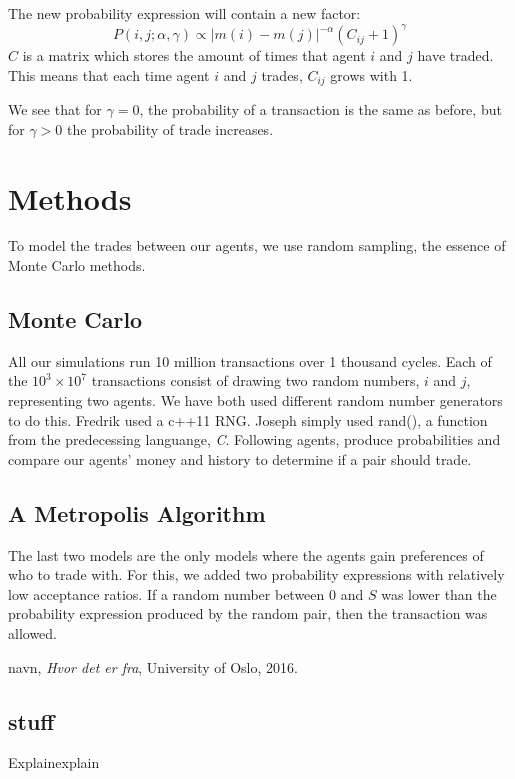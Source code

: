 \documentclass[10pt, a4paper]{article}
\begin{document}
The new probability expression will contain a new factor:
\begin{equation}
 P(i,j;\alpha,\gamma) \propto \left|m(i)-m(j) \right|^{-\alpha}(C_{ij} + 1)^{\gamma}
\end{equation}
$C$ is a matrix which stores the amount of times that agent $i$ and $j$ have traded.
This means that each time agent $i$ and $j$ trades, $C_{ij}$ grows with 1.

We see that for $\gamma = 0$, the probability of a transaction is the same as before, but for
$\gamma > 0$ the probability of trade increases.

\section{Methods}

To model the trades between our agents, we use random sampling, the essence of Monte Carlo methods.
\subsection{Monte Carlo}
All our simulations run 10 million transactions over 1 thousand cycles. Each of the $10^3 \times 10^7$ transactions consist of drawing two random numbers, $i$ and $j$, representing two agents.
We have both used different random number generators to do this. Fredrik used a c++11 RNG. Joseph simply used rand(), a function from the predecessing languange, \emph{C}.
Following agents, produce probabilities and compare our agents' money and history to determine if a 
pair should trade.
\subsection{A Metropolis Algorithm}
The last two models are the only models where the agents gain preferences of who to trade with. For this, we added two probability expressions with relatively low acceptance ratios.
If a random number between $0$ and $S$ was lower than the probability expression produced by the random pair, then the transaction was allowed.

\begin{thebibliography}{9}

	navn,
	\emph{Hvor det er fra},
	University of Oslo,
	2016.
	
\end{thebibliography}

\begin{appendix}
\section{stuff}
\label{app1}
Explainexplain

\end{appendix}
\end{document}
